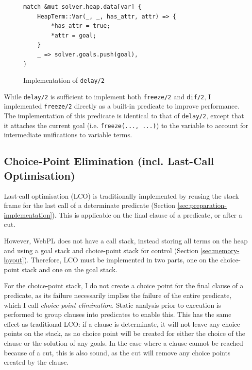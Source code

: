\begin{figure}[H]
\centering
\begin{verbatim}
match &mut solver.heap.data[var] {
    HeapTerm::Var(_, _, has_attr, attr) => {
        *has_attr = true;
        *attr = goal;
    }
    _ => solver.goals.push(goal),
}
\end{verbatim}
\caption{Implementation of \texttt{delay/2}}
\label{fig:delay-impl}
\end{figure}

While \texttt{delay/2} is sufficient to implement both \texttt{freeze/2} and \texttt{dif/2}, I implemented \texttt{freeze/2} directly as a built-in predicate to improve performance. The implementation of this predicate is identical to that of \texttt{delay/2}, except that it attaches the current goal (i.e. \texttt{freeze(..., ...)}) to the variable to account for intermediate unifications to variable terms.

\subsection{Choice-Point Elimination (incl. Last-Call Optimisation)}

\label{sec:choice-point-elimination}

Last-call optimisation (LCO) is traditionally implemented by reusing the stack frame for the last call of a determinate predicate (Section \ref{sec:preparation-implementation}). This is applicable on the final clause of a predicate, or after a cut.

However, WebPL does not have a call stack, instead storing all terms on the heap and using a goal stack and choice-point stack for control (Section \ref{sec:memory-layout}). Therefore, LCO must be implemented in two parts, one on the choice-point stack and one on the goal stack.

For the choice-point stack, I do not create a choice point for the final clause of a predicate, as its failure necessarily implies the failure of the entire predicate, which I call \emph{choice-point elimination}. Static analysis prior to execution is performed to group clauses into predicates to enable this. This has the same effect as traditional LCO: if a clause is determinate, it will not leave any choice points on the stack, as no choice point will be created for either the choice of the clause or the solution of any goals. In the case where a clause cannot be reached because of a cut, this is also sound, as the cut will remove any choice points created by the clause.

